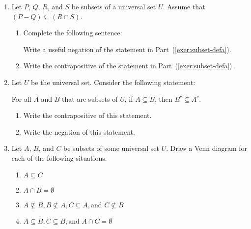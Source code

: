 \begin{enumerate}
\item Let $P$, $Q$, $R$, and $S$ be subsets of a universal set $U$.  Assume that \\
$\left( P - Q \right) \subseteq \left( R \cap S \right)$.
\label{exer:sec41-4sets}
\begin{enumerate}
\item Complete the following sentence: \label{exer:subset-defa}
\yitem Write a useful negation of the statement in Part~(\ref{exer:subset-defa}).
\item Write the contrapositive of the statement in Part~(\ref{exer:subset-defa}).
\end{enumerate}
%
\item Let $U$ be the universal set.  Consider the following statement: \label{exer:sec41-10}
\begin{center}
For all $A$ and $B$ that are subsets of $U$, if $A \subseteq B$, then $B^c \subseteq A^c$.
\end{center}
\begin{enumerate}
\yitem Identify three conditional statements in the given statement.
\item Write the contrapositive of this statement.
\item Write the negation of this statement.
\end{enumerate}
%
\item Let  $A$, $B$, and  $C$  be subsets of some universal set  $U$.  Draw a Venn diagram for each of the following situations. \label{exer:sec41-11}
\begin{enumerate}
\item $A \subseteq C$
\item $A \cap B = \emptyset $
\item $A \not \subseteq B,B \not \subseteq A,C \subseteq A,\text{and }C \not \subseteq B$
\item $A \subseteq B,C \subseteq B,\text{and }A \cap C = \emptyset $

\end{enumerate}
\end{enumerate}

